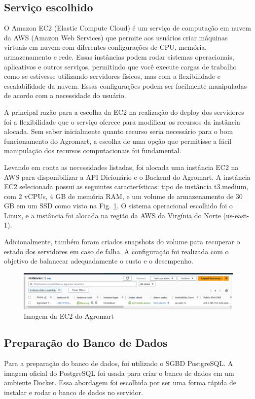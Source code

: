 \subsection{Serviço escolhido}
O Amazon EC2 (Elastic Compute Cloud) é um serviço de computação em nuvem da AWS (Amazon Web Services) que permite aos usuários criar máquinas virtuais em nuvem com diferentes configurações de CPU, memória, armazenamento e rede. Essas instâncias podem rodar sistemas operacionais, aplicativos e outros serviços, permitindo que você execute cargas de trabalho como se estivesse utilizando servidores físicos, mas com a flexibilidade e escalabilidade da nuvem. Essas configurações podem ser facilmente manipuladas de acordo com a necessidade do usuário.

A principal razão para a escolha da EC2 na realização do deploy dos servidores foi a flexibilidade que o serviço oferece para modificar os recursos da instância alocada. Sem saber inicialmente quanto recurso seria necessário para o bom funcionamento do Agromart, a escolha de uma opção que permitisse a fácil manipulação dos recursos computacionais foi fundamental.

Levando em conta as necessidades listadas, foi alocada uma instância EC2 na AWS para disponibilizar a API Dicionário e o Backend do Agromart. A instância EC2 selecionada possui as seguintes características: tipo de instância t3.medium, com 2 vCPUs, 4 GB de memória RAM, e um volume de armazenamento de 30 GB em um SSD como visto na Fig. \ref{ec2}. O sistema operacional escolhido foi o Linux, e a instância foi alocada na região da AWS da Virgínia do Norte (us-east-1).

Adicionalmente, também foram criados snapshots do volume para recuperar o estado dos servidores em caso de falha. A configuração foi realizada com o objetivo de balancear adequadamente o custo e o desempenho.

\begin{figure}[h]
        \centering
        \includegraphics[keepaspectratio=true,scale=0.3]{figuras/ec2_agromart.png}
        \caption{Imagem da EC2 do Agromart}
        \label{ec2}
\end{figure}

\subsection{Preparação do Banco de Dados}
Para a preparação do banco de dados, foi utilizado o SGBD PostgreSQL. A imagem oficial do PostgreSQL foi usada para criar o banco de dados em um ambiente Docker. Essa abordagem foi escolhida por ser uma forma rápida de instalar e rodar o banco de dados no servidor.

